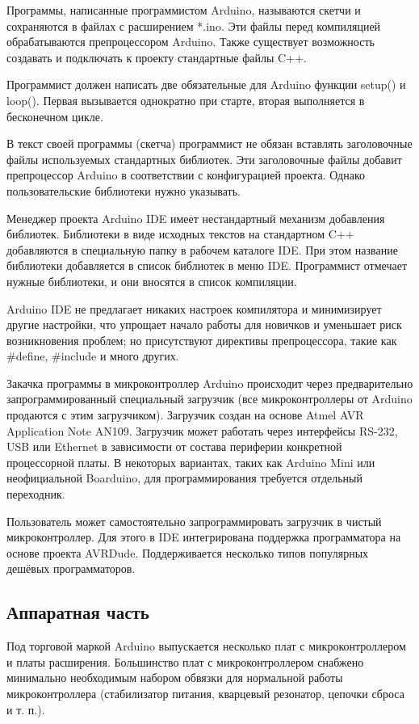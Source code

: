 \documentclass[12pt, oneside]{altsu-report}
\begin{document}
Программы, написанные программистом Arduino, называются скетчи и сохраняются в файлах с расширением *.ino. Эти файлы перед компиляцией обрабатываются препроцессором Arduino. Также существует возможность создавать и подключать к проекту стандартные файлы C++.

Программист должен написать две обязательные для Arduino функции setup() и loop(). Первая вызывается однократно при старте, вторая выполняется в бесконечном цикле.

В текст своей программы (скетча) программист не обязан вставлять заголовочные файлы используемых стандартных библиотек. Эти заголовочные файлы добавит препроцессор Arduino в соответствии с конфигурацией проекта. Однако пользовательские библиотеки нужно указывать.

Менеджер проекта Arduino IDE имеет нестандартный механизм добавления библиотек. Библиотеки в виде исходных текстов на стандартном C++ добавляются в специальную папку в рабочем каталоге IDE. При этом название библиотеки добавляется в список библиотек в меню IDE. Программист отмечает нужные библиотеки, и они вносятся в список компиляции.

Arduino IDE не предлагает никаких настроек компилятора и минимизирует другие настройки, что упрощает начало работы для новичков и уменьшает риск возникновения проблем; но присутствуют директивы препроцессора, такие как \#define, \#include и много других.

Закачка программы в микроконтроллер Arduino происходит через предварительно запрограммированный специальный загрузчик (все микроконтроллеры от Arduino продаются с этим загрузчиком). Загрузчик создан на основе Atmel AVR Application Note AN109. Загрузчик может работать через интерфейсы RS-232, USB или Ethernet в зависимости от состава периферии конкретной процессорной платы. В некоторых вариантах, таких как Arduino Mini или неофициальной Boarduino, для программирования требуется отдельный переходник.

Пользователь может самостоятельно запрограммировать загрузчик в чистый микроконтроллер. Для этого в IDE интегрирована поддержка программатора на основе проекта AVRDude. Поддерживается несколько типов популярных дешёвых программаторов.

\subsection{Аппаратная часть}

Под торговой маркой Arduino выпускается несколько плат с микроконтроллером и платы расширения. Большинство плат с микроконтроллером снабжено минимально необходимым набором обвязки для нормальной работы микроконтроллера (стабилизатор питания, кварцевый резонатор, цепочки сброса и т. п.).
\end{document}
